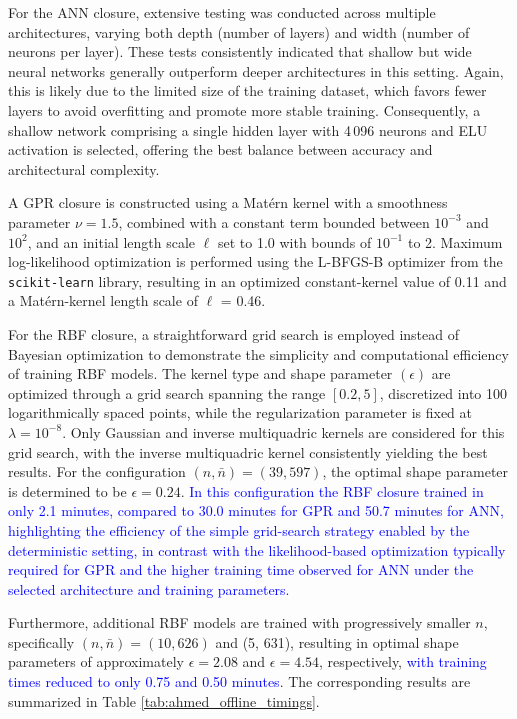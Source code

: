 \documentclass[preprint,10pt]{elsarticle}
\begin{document}
For the ANN closure, extensive testing was conducted across multiple architectures, varying both depth (number of layers) and width (number of neurons per layer). These tests consistently indicated that shallow but wide neural networks generally outperform deeper architectures in this setting. Again, this is likely due to the limited size of the training dataset, which favors fewer layers to avoid overfitting and promote more stable training. Consequently, a shallow network comprising a single hidden layer with 4\,096 neurons and ELU activation is selected, offering the best balance between accuracy and architectural complexity.

A GPR closure is constructed using a Mat\'ern kernel with a smoothness parameter $\nu = 1.5$, combined with a constant term bounded between $10^{-3}$ and $10^{2}$, and an initial length scale $\ell$ set to 1.0 with bounds of $10^{-1}$ to 2. Maximum log-likelihood optimization is performed using the L-BFGS-B optimizer from the \texttt{scikit-learn} library, resulting in an optimized constant-kernel value of 0.11 and a Mat\'ern-kernel length scale of $\ell$ = 0.46.

For the RBF closure, a straightforward grid search is employed instead of Bayesian optimization to demonstrate the simplicity and computational efficiency of training RBF models. The kernel type and shape parameter $(\epsilon)$ are optimized through a grid search spanning the range $[0.2, 5]$, discretized into 100 logarithmically spaced points, while the regularization parameter is fixed at $\lambda = 10^{-8}$. Only Gaussian and inverse multiquadric kernels are considered for this grid search, with the inverse multiquadric kernel consistently yielding the best results. For the configuration $(n, \bar{n}) = (39, 597)$, the optimal shape parameter is determined to be $\epsilon = 0.24$.  
\textcolor{blue}{In this configuration the RBF closure trained in only 2.1 minutes, compared to 30.0 minutes for GPR and 50.7 minutes for ANN, highlighting the efficiency of the simple grid-search strategy enabled by the deterministic setting, in contrast with the likelihood-based optimization typically required for GPR and the higher training time observed for ANN under the selected architecture and training parameters.}

Furthermore, additional RBF models are trained with progressively smaller $n$, specifically $(n, \bar{n}) = (10, 626)$ and (5, 631), resulting in optimal shape parameters of approximately $\epsilon = 2.08$ and $\epsilon = 4.54$, respectively, \textcolor{blue}{with training times reduced to only 0.75 and 0.50 minutes}. The corresponding results are summarized in Table \ref{tab:ahmed_offline_timings}.
\end{document}
